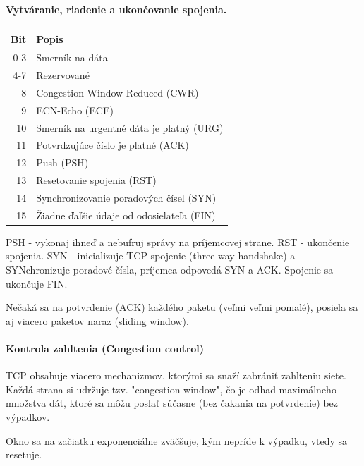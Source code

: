\documentclass[10pt,a4paper]{article}
\begin{document}
\paragraph{Vytváranie, riadenie a ukončovanie spojenia.} 

\begin{center}
\begin{tabular}{ r | l }       
  Bit & Popis\\
\hline              
  0-3 & Smerník na dáta\\              
  4-7 & Rezervované\\              
  8 & Congestion Window Reduced (CWR)\\              
  9 & ECN-Echo (ECE)\\              
  10 & Smerník na urgentné dáta je platný (URG)\\              
  11 & Potvrdzujúce číslo je platné (ACK)\\              
  12 & Push (PSH)\\           
  13 & Resetovanie spojenia (RST)\\           
  14 & Synchronizovanie poradových čísel (SYN)\\           
  15 & Žiadne ďaľšie údaje od odosielateľa (FIN)\\
\end{tabular}
\end{center}

PSH - vykonaj ihneď a nebufruj správy na príjemcovej strane. RST - ukončenie spojenia. 
SYN - inicializuje TCP spojenie (three way handshake) a SYNchronizuje poradové čísla,
príjemca odpovedá SYN a ACK. Spojenie sa ukončuje FIN. 

Nečaká sa na potvrdenie (ACK) každého paketu (veľmi veľmi pomalé), posiela sa aj viacero paketov naraz (sliding window). 

\paragraph{Kontrola zahltenia (Congestion control)}

TCP obsahuje viacero mechanizmov, ktorými sa snaží zabrániť zahlteniu siete. Každá strana si udržuje tzv. "congestion window", čo je odhad maximálneho množstva dát, ktoré sa môžu poslať súčasne (bez čakania na potvrdenie) bez výpadkov.

Okno sa na začiatku exponenciálne zväčšuje, kým nepríde k výpadku, vtedy sa resetuje. 

\end{document}
